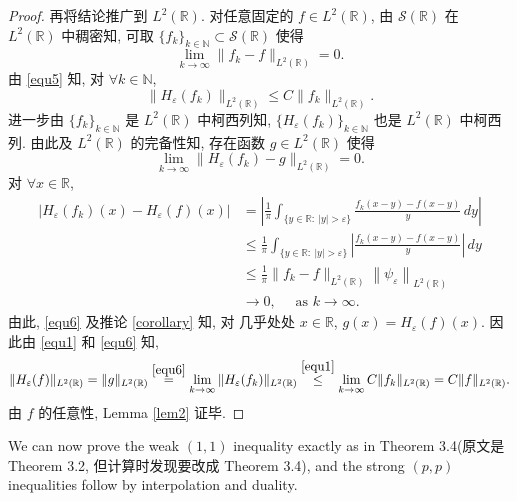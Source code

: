 \documentclass[a4paper,11pt]{article}
\theoremstyle{definition}
\begin{document}
\begin{proof}
    再将结论推广到 $ L^2(\mathbb{R}) $.
    对任意固定的 $ f \in L^2(\mathbb{R}) $, 由 $ \mathcal{S}(\mathbb{R}) $ 在 $ L^2(\mathbb{R}) $ 中稠密知, 
    可取 $ \{f_k\}_{k \in \mathbb{N}} \subset \mathcal{S}(\mathbb{R}) $ 使得
    $$
        \lim_{k \to \infty} \| f_k - f \|_{L^2(\mathbb{R})} = 0.
    $$
    由 \eqref{equ5} 知, 对 $ \forall k \in \mathbb{N} $,
    \begin{equation} \label{equ1}
        \| H_\varepsilon (f_k) \|_{L^2(\mathbb{R})} \leq C \| f_k \|_{L^2(\mathbb{R})}.
    \end{equation}
    进一步由 $ \{f_k\}_{k \in \mathbb{N}} $ 是 $ L^2(\mathbb{R}) $ 中柯西列知, 
    $ \{H_\varepsilon (f_k)\}_{k \in \mathbb{N}} $ 也是 $ L^2(\mathbb{R}) $ 中柯西列.
    由此及 $ L^2(\mathbb{R}) $ 的完备性知, 存在函数 $ g \in L^2(\mathbb{R}) $ 使得
    \begin{equation} \label{equ6}
        \lim_{k \to \infty} \| H_\varepsilon (f_k) - g \|_{L^2(\mathbb{R})} = 0.
    \end{equation}
    对 $ \forall x \in \mathbb{R} $,
    \begin{align*}
        |H_\varepsilon (f_k) (x) - H_\varepsilon (f) (x)|
            &= \left| \frac{1}{\pi} \int_{\{y \in \mathbb{R}:\ |y| > \varepsilon\}} 
                \frac{f_k(x - y) - f(x - y)}{y} \, dy \right| \\
            &\leq \frac{1}{\pi} \int_{\{y \in \mathbb{R}:\ |y| > \varepsilon\}} 
                \left| \frac{f_k(x - y) - f(x - y)}{y} \right| \, dy \\
            &\leq \frac{1}{\pi} \| f_k - f \|_{L^2(\mathbb{R})} 
                \left\| \psi_\varepsilon \right\|_{L^2(\mathbb{R})} \\
            &\to  0,  \quad \text{ as } k \to \infty.
    \end{align*}
    由此, \eqref{equ6} 及推论 \ref{corollary} 知, 对 几乎处处 $ x \in \mathbb{R} $, $ g(x) = H_\varepsilon (f) (x) $.
    因此由 \eqref{equ1} 和 \eqref{equ6} 知, 
    $$
        \| H_\varepsilon (f) \|_{L^2(\mathbb{R})} 
            = \| g \|_{L^2(\mathbb{R})} 
            \overset{\eqref{equ6}}{=} \lim_{k \to \infty} \| H_\varepsilon (f_k) \|_{L^2(\mathbb{R})} 
            \overset{\eqref{equ1}}{\leq} \lim_{k \to \infty} C \| f_k \|_{L^2(\mathbb{R})} 
            = C \| f \|_{L^2(\mathbb{R})}.
    $$
    由 $ f $ 的任意性, Lemma \ref{lem2} 证毕.
\end{proof}

\begin{framed}
    We can now prove the weak $ (1,1) $ inequality exactly as in
    Theorem 3.4(原文是 Theorem 3.2, 但计算时发现要改成 Theorem 3.4), 
    and the strong $ (p, p) $ inequalities follow by interpolation and duality.
\end{framed}
\end{document}

